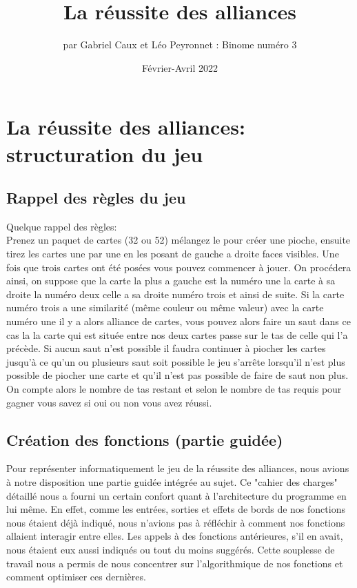 \documentclass[10pt,a4paper,french,titlepage]{article}
\author{par Gabriel Caux et Léo Peyronnet : Binome numéro 3}
\title{La réussite des alliances}
\date{Février-Avril 2022}
\begin{document}
\maketitle
\tableofcontents
\section{La réussite des alliances: structuration du jeu}
\subsection{Rappel des règles du jeu}
Quelque rappel des règles:\\
Prenez un paquet de cartes (32 ou 52) mélangez le pour créer une pioche, ensuite tirez les cartes une par une en les posant de gauche a droite faces visibles. Une fois que trois cartes ont été posées vous pouvez commencer à jouer. On procédera ainsi, on suppose que la carte la plus a gauche est la numéro une la carte à sa droite la numéro deux celle a sa droite numéro trois et ainsi de suite. Si la carte numéro trois a une similarité (même couleur ou même valeur) avec la carte numéro une il y a alors alliance de cartes, vous pouvez alors faire un saut dans ce cas la la carte qui est située entre nos deux cartes passe sur le tas de celle qui l'a précède. Si aucun saut n'est possible il faudra continuer à piocher les cartes jusqu'à ce qu'un ou plusieurs saut soit possible le jeu s'arrête lorsqu'il n'est plus possible de piocher une carte et qu'il n'est pas possible de faire de saut non plus. On compte alors le nombre de tas restant et selon le nombre de tas requis pour gagner vous savez si oui ou non vous avez réussi.

\subsection{Création des fonctions (partie guidée)}
Pour représenter informatiquement le jeu de la réussite des alliances, nous avions à notre disposition une partie guidée intégrée au sujet.
Ce "cahier des charges" détaillé nous a fourni un certain confort quant à l'architecture du programme en lui même. En effet, comme les entrées, 
sorties et effets de bords de nos fonctions nous étaient déjà indiqué, nous n'avions pas à réfléchir à comment nos fonctions allaient interagir entre elles. Les appels à des fonctions antérieures, s'il en avait, nous étaient eux aussi indiqués ou tout du moins suggérés. Cette souplesse de travail nous
a permis de nous concentrer sur l'algorithmique de nos fonctions et comment optimiser ces dernières.\\
\end{document}
